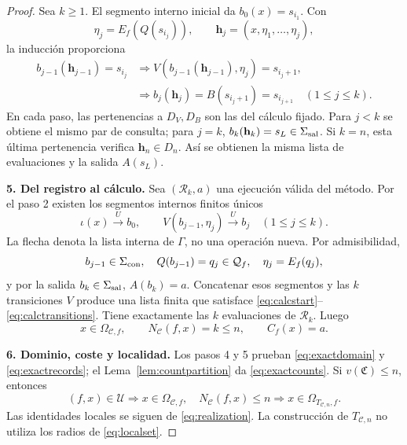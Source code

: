 \documentclass[11pt,a4paper]{article}
\numberwithin{equation}{section}
\theoremstyle{definition}
\theoremstyle{remark}
\newcommand{\QQ}{\mathcal Q}
\newcommand{\Rec}{\mathcal R}
\newcommand{\hc}{\mathbf h}
\newcommand{\paso}[1]{\par\smallskip\noindent\textbf{#1}\quad}
\begin{document}
\begin{proof}
Sea $k\ge1$. El segmento interno inicial da $b_0(x)=s_{i_1}$. Con
\[
\eta_j=E_f(Q(s_{i_j})),\qquad \hc_j=(x,\eta_1,\ldots,\eta_j),
\]
la inducción proporciona
\begin{align*}
b_{j-1}(\hc_{j-1})=s_{i_j}
&\Longrightarrow V(b_{j-1}(\hc_{j-1}),\eta_j)=s_{i_j+1},\\
&\Longrightarrow b_j(\hc_j)=B(s_{i_j+1})=s_{i_{j+1}}
\quad(1\le j\le k).
\end{align*}
En cada paso, las pertenencias a $D_V,D_B$ son las del cálculo fijado. Para $j<k$ se obtiene el mismo par de consulta; para $j=k$, $b_k(\hc_k)=s_L\in\Sigma_{\rm sal}$. Si $k=n$, esta última pertenencia verifica $\hc_n\in D_n$. Así se obtienen la misma lista de evaluaciones y la salida $A(s_L)$.
\paso{5. Del registro al cálculo.}
Sea $(\Rec_k,a)$ una ejecución válida del método. Por el paso 2 existen los segmentos internos finitos únicos
\[
\iota(x)\xrightarrow{\ U\ }b_0,\qquad
V(b_{j-1},\eta_j)\xrightarrow{\ U\ }b_j\quad(1\le j\le k).
\]
La flecha denota la lista interna de $\Gamma$, no una operación nueva. Por admisibilidad,
\[
b_{j-1}\in\Sigma_{\rm con},\quad Q(b_{j-1})=q_j\in\QQ_f,
\quad\eta_j=E_f(q_j),
\]
y por la salida $b_k\in\Sigma_{\rm sal}$, $A(b_k)=a$. Concatenar esos segmentos y las $k$ transiciones $V$ produce una lista finita que satisface \eqref{eq:calcstart}--\eqref{eq:calctransitions}. Tiene exactamente las $k$ evaluaciones de $\Rec_k$. Luego
\[
x\in\Omega_{\mathscr C,f},\qquad N_{\mathscr C}(f,x)=k\le n,\qquad C_f(x)=a.
\]
\paso{6. Dominio, coste y localidad.}
Los pasos 4 y 5 prueban \eqref{eq:exactdomain} y \eqref{eq:exactrecords}; el Lema~\ref{lem:countpartition} da \eqref{eq:exactcounts}. Si $v(\mathfrak C)\le n$, entonces
\[
(f,x)\in\mathcal U\Longrightarrow
x\in\Omega_{\mathscr C,f},\quad N_{\mathscr C}(f,x)\le n
\Longrightarrow x\in\Omega_{T_{\mathscr C,n},f}.
\]
Las identidades locales se siguen de \eqref{eq:realization}. La construcción de $T_{\mathscr C,n}$ no utiliza los radios de \eqref{eq:localset}.
\end{proof}
\end{document}
